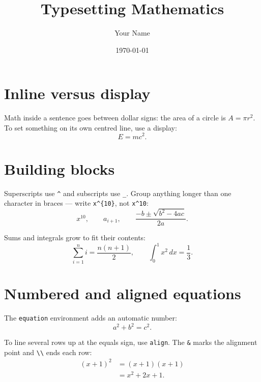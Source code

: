 \documentclass[12pt]{article}
\title{Typesetting Mathematics}
\author{Your Name}
\date{\today}
\begin{document}
\maketitle

\section{Inline versus display}

Math inside a sentence goes between dollar signs: the area of a circle
is $A = \pi r^2$. To set something on its own centred line, use a
display:
\[
    E = mc^2.
\]

\section{Building blocks}

Superscripts use \verb|^| and subscripts use \verb|_|. Group anything
longer than one character in braces --- write \verb|x^{10}|, not
\verb|x^10|:
\[
    x^{10}, \qquad a_{i+1}, \qquad \frac{-b \pm \sqrt{b^2 - 4ac}}{2a}.
\]

Sums and integrals grow to fit their contents:
\[
    \sum_{i=1}^{n} i = \frac{n(n+1)}{2}, \qquad
    \int_0^1 x^2 \, dx = \frac{1}{3}.
\]

\section{Numbered and aligned equations}

The \texttt{equation} environment adds an automatic number:
\begin{equation}
    a^2 + b^2 = c^2.
\end{equation}

To line several rows up at the equals sign, use \texttt{align}. The
\verb|&| marks the alignment point and \verb|\\| ends each row:
\begin{align}
    (x+1)^2 &= (x+1)(x+1) \\
            &= x^2 + 2x + 1.
\end{align}
\end{document}
